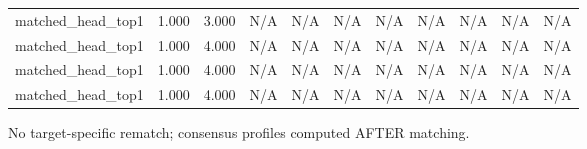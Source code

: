 \begin{table}[h!]
\begin{tabular}{lrrrrrrrrrr}
matched\_head\_top1 & 1.000 & 3.000 & N/A & N/A & N/A & N/A & N/A & N/A & N/A & N/A \\
matched\_head\_top1 & 1.000 & 4.000 & N/A & N/A & N/A & N/A & N/A & N/A & N/A & N/A \\
matched\_head\_top1 & 1.000 & 4.000 & N/A & N/A & N/A & N/A & N/A & N/A & N/A & N/A \\
matched\_head\_top1 & 1.000 & 4.000 & N/A & N/A & N/A & N/A & N/A & N/A & N/A & N/A \\
\bottomrule
\end{tabular}
\vspace{4pt}
\footnotesize{No target-specific rematch; consensus profiles computed AFTER matching.}\\
\end{table}
